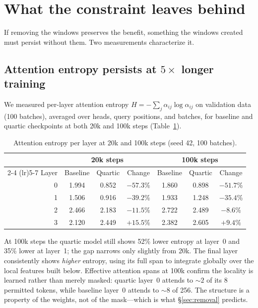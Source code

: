 \documentclass[11pt,a4paper]{article}
\begin{document}
\section{What the constraint leaves behind}
\label{sec:mechanism}

If removing the windows preserves the benefit, something the windows created must persist without them. Two measurements characterize it.

\subsection{Attention entropy persists at $5\times$ longer training}

We measured per-layer attention entropy $H = -\sum_j \alpha_{ij} \log \alpha_{ij}$ on validation data (100 batches), averaged over heads, query positions, and batches, for baseline and quartic checkpoints at both 20k and 100k steps (Table~\ref{tab:entropy}).

\begin{table}[H]
\centering
\caption{Attention entropy per layer at 20k and 100k steps (seed 42, 100 batches).}
\label{tab:entropy}
\begin{tabular}{rcccccc}
\toprule
 & \multicolumn{3}{c}{20k steps} & \multicolumn{3}{c}{100k steps} \\
\cmidrule(lr){2-4} \cmidrule(lr){5-7}
Layer & Baseline & Quartic & Change & Baseline & Quartic & Change \\
\midrule
0 & 1.994 & 0.852 & $-57.3$\% & 1.860 & 0.898 & $-51.7$\% \\
1 & 1.506 & 0.916 & $-39.2$\% & 1.933 & 1.248 & $-35.4$\% \\
2 & 2.466 & 2.183 & $-11.5$\% & 2.722 & 2.489 & $-8.6$\% \\
3 & 2.120 & 2.449 & $+15.5$\% & 2.382 & 2.605 & $+9.4$\% \\
\bottomrule
\end{tabular}
\end{table}

At 100k steps the quartic model still shows 52\% lower entropy at layer~0 and 35\% lower at layer~1; the gap narrows only slightly from 20k. The final layer consistently shows \emph{higher} entropy, using its full span to integrate globally over the local features built below. Effective attention spans at 100k confirm the locality is learned rather than merely masked: quartic layer~0 attends to ${\sim}2$ of its 8 permitted tokens, while baseline layer~0 attends to ${\sim}8$ of 256. The structure is a property of the weights, not of the mask---which is what \S\ref{sec:removal} predicts.
\end{document}
